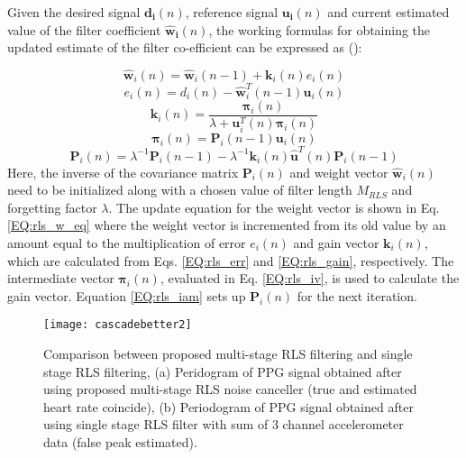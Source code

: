 \documentclass[final,3p,times,authoryear]{elsarticle}
\begin{document}
Given the desired signal $\boldsymbol{d_i}(n)$, reference signal $\boldsymbol{u_i}(n)$ and current estimated value of the filter coefficient $\boldsymbol{\hat{w}_i}(n)$, the working formulas for obtaining the updated estimate of the filter co-efficient can be expressed as (\cite{bib:book1}):







\begin{equation}
\hat{\boldsymbol{w}}_i(n) = \hat{\boldsymbol{w}}_i(n-1) + \boldsymbol{k}_i(n) e_i(n) \label{EQ:rls_w_eq}
\end{equation}
\begin{equation}
e_i(n) = d_i(n) - \hat{\boldsymbol{w}}_i^T(n-1) \boldsymbol{u}_i(n) \label{EQ:rls_err}
\end{equation}
\begin{equation}
\boldsymbol{k}_i(n) =  \frac{\boldsymbol{\pi}_i(n)}{\lambda + \boldsymbol{u}_i^T(n) \boldsymbol{\pi}_i(n)} \label{EQ:rls_gain}
\end{equation}
\begin{equation}
\boldsymbol{\pi}_i(n) = \boldsymbol{P}_i(n-1)\boldsymbol{u}_i(n) \label{EQ:rls_iv}
\end{equation}
\begin{equation}
\boldsymbol{P}_i(n) = \lambda ^ {-1} \boldsymbol{P}_i(n-1)- \lambda ^ {-1} \boldsymbol{k}_i(n) \hat{\boldsymbol{u}}^T(n) \boldsymbol{P}_i(n-1)   \label{EQ:rls_iam}
\end{equation}
Here, the inverse of the covariance matrix $\boldsymbol{P}_i(n)$ and weight vector $\boldsymbol{\hat{w}}_i(n)$ need to be initialized along with a chosen value of filter length $M_{RLS}$ and forgetting factor $\lambda$.
The update equation for the weight vector is shown in Eq. {\ref{EQ:rls_w_eq}} where the weight vector is incremented from its old value by an amount equal to the multiplication of error $e_i(n)$ and gain vector $\mathbf{k}_i(n)$, which are calculated from Eqs. {\ref{EQ:rls_err}} and {\ref{EQ:rls_gain}}, respectively. The intermediate vector $\boldsymbol{\pi}_i(n)$, evaluated in Eq. {\ref{EQ:rls_iv}}, is used to calculate the gain vector. Equation {\ref{EQ:rls_iam}} sets up $\mathbf{P}_i(n)$ for the next iteration.

 

\begin{figure}[h]
  \centering
  \texttt{[image: cascadebetter2]}\\
  \caption{ Comparison between proposed multi-stage RLS filtering and single stage RLS filtering, (a) Peridogram of PPG signal obtained after using proposed multi-stage RLS noise canceller (true and estimated heart rate coincide), (b) Periodogram of PPG signal obtained after using single stage RLS filter with sum of 3 channel accelerometer data (false peak estimated).}\label{Fig:sumworse}
\end{figure}
\end{document}
